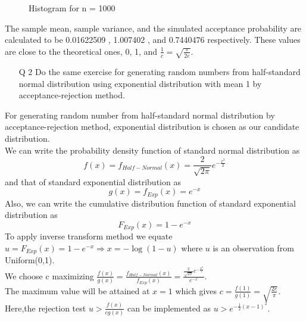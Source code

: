 \documentclass[11pt]{article}
\begin{document}
\begin{figure}[H]
  \centering
    \caption{Histogram for n = 1000}
\end{figure}

The sample mean, sample variance, and the simulated acceptance probability are calculated to be 0.01622509 , 1.007402 , and 0.7440476 respectively.
These values are close to the theoretical ones, 0, 1, and $\frac{1}{c} = \sqrt{\frac{\pi}{2e}}$.

\newpage

\begin{enumerate}
\item[Q 2]  Do the same exercise for generating random numbers from half-standard normal distribution using exponential distribution with mean 1 by acceptance-rejection method.
\end{enumerate}

  For generating random number from half-standard normal distribution by acceptance-rejection method, exponential distribution is chosen as our candidate distribution.\\
We can write the probability density function of standard normal distribution as
$$f(x) = f_{Half-Normal}(x) = \frac{2}{\sqrt{2\pi}}e^{-\frac{x^2}{2}}$$
and that of standard exponential distribution as
$$g(x) = f_{Exp}(x) = e^{-x}$$
Also, we can write the cumulative distribution function of standard exponential distribution as
$$F_{Exp}(x) = 1 - e^{-x}$$
To apply inverse transform method we equate $u = F_{Exp}(x) = 1 - e^{-x}   \Rightarrow   x = -\log(1 - u)$ where $u$ is an observation from Uniform(0,1).\\
We choose c maximizing $\frac{f(x)}{g(x)} = \frac{f_{Half-Normal}(x)}{f_{Exp}(x)} = \frac{\frac{2}{\sqrt{2\pi}}e^{-\frac{x^2}{2}}}{e^{-x}}$.\\
The maximum value will be attained at $x = 1$ which gives $c = \frac{f(1)}{g(1)} = \sqrt{\frac{2e}{\pi}}$.\\
Here,the rejection test $u > \frac{f(x)}{cg(x)}$ can be implemented as $u > e^{-\frac{1}{2}(x - 1)^{2}}$.
\end{document}

